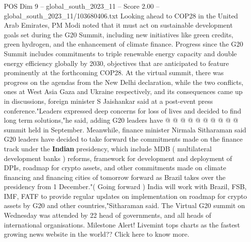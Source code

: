 \begin{textsample}{POS Dim 9 – global\_south\_2023\_11 – Score 2.00 – global\_south\_2023\_11/103680406.txt}
Looking ahead to COP28 in the United Arab Emirates, PM Modi noted that it must act on sustainable development goals set during the G20 Summit, including new initiatives like green credits, green hydrogen, and the enhancement of climate finance.
Progress since the G20 Summit includes commitments to triple renewable energy capacity and double energy efficiency globally by 2030, objectives that are anticipated to feature prominently at the forthcoming COP28.
At the virtual summit, there was progress on the agendas from the New Delhi declaration, while the two conflicts, ones at West Asia Gaza and Ukraine respectively, and its consequences came up in discussions, foreign minister S Jaishankar said at a post-event press conference."Leaders expressed deep concerns for loss of lives and decided to find long term solutions,"he said, adding G20 leaders have @ @ @ @ @ @ @ @ @ @ summit held in September.
Meanwhile, finance minister Nirmala Sitharaman said G20 leaders have decided to take forward the commitments made on the finance track under the \textbf{Indian} presidency, which include MDB ( multilateral development banks ) reforms, framework for development and deployment of DPIs, roadmap for crypto assets, and other commitments made on climate financing and financing cities of tomorrow forward as Brazil takes over the presidency from 1 December."( Going forward ) India will work with Brazil, FSB, IMF, FATF to provide regular updates on implementation on roadmap for crypto assets by G20 and other countries,"Sitharaman said.
The Virtual G20 summit on Wednesday was attended by 22 head of governments, and all heads of international organisations.
Milestone Alert!
Livemint tops charts as the fastest growing news website in the world??
Click here to know more.

\end{textsample}
